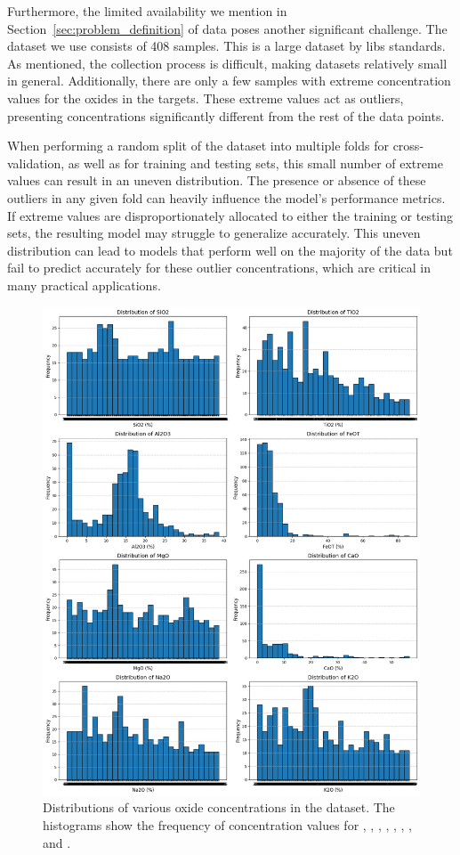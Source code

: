 Furthermore, the limited availability we mention in Section~\ref{sec:problem_definition} of data poses another significant challenge.
The dataset we use consists of 408 samples. This is a large dataset by \gls{libs} standards.
As mentioned, the collection process is difficult, making datasets relatively small in general.
Additionally, there are only a few samples with extreme concentration values for the oxides in the targets.
These extreme values act as outliers, presenting concentrations significantly different from the rest of the data points.

When performing a random split of the dataset into multiple folds for cross-validation, as well as for training and testing sets, this small number of extreme values can result in an uneven distribution.
The presence or absence of these outliers in any given fold can heavily influence the model's performance metrics.
If extreme values are disproportionately allocated to either the training or testing sets, the resulting model may struggle to generalize accurately.
This uneven distribution can lead to models that perform well on the majority of the data but fail to predict accurately for these outlier concentrations, which are critical in many practical applications.

\begin{figure}[h!]
    \centering
    \includegraphics[width=\textwidth]{images/oxide_distributions.png}
    \caption{Distributions of various oxide concentrations in the dataset. The histograms show the frequency of concentration values for , , , , , , , and .}
    \label{fig:oxide_distributions}
\end{figure}

